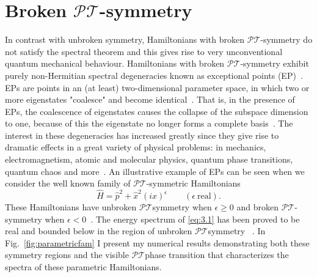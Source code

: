\documentclass[12pt, a4paper]{report}
\newcommand\PT{\(\mathcal{PT}\)}
\begin{document}
\chapter{Broken \PT-symmetry}\label{EPs}
In contrast with unbroken symmetry, Hamiltonians with broken \PT-symmetry do not satisfy the spectral theorem and this gives rise to very unconventional quantum mechanical behaviour. Hamiltonians with broken \PT-symmetry exhibit purely non-Hermitian spectral degeneracies known as exceptional points (EP)~\cite{Bossart}.
EPs are points in an (at least) two-dimensional parameter space, in which two or more eigenstates "coalesce" and become identical~\cite{Moiseyev, Cartarius}. That is, in the presence of EPs, the coalescence of eigenstates causes the collapse of the subspace dimension to one, because of this the eigenstate no longer forms a complete basis~\cite{Bagarello}. The interest in these degeneracies has increased greatly since they give rise to dramatic effects in a great variety of physical problems: in mechanics, electromagnetism, atomic and molecular physics, quantum phase transitions, quantum chaos and more~\cite{Heiss_2012}.
An illustrative example of EPs can be seen when we consider the well known family of \PT-symmetric Hamiltonians
\begin{equation}\label{eq:3.1}
\hat{H} = \hat{p}^2 + \hat{x}^{2}(i x)^{\epsilon} \quad\quad (\epsilon\:\mathrm{real}). 
\end{equation}
These Hamiltonians have unbroken \PT\:symmetry when $\epsilon \geq 0$ and broken \PT-symmetry when $\epsilon < 0$~\cite{MakingSense}. The energy spectrum of \ref{eq:3.1} has been proved to be real and bounded below in the region of unbroken \PT\:symmetry ~\cite{Dorey_2004}. In Fig.~\ref{fig:parametricfam} I present my numerical results demonstrating both these symmetry regions and the visible \PT\:phase transition that characterizes the spectra of these parametric Hamiltonians.
\end{document}
